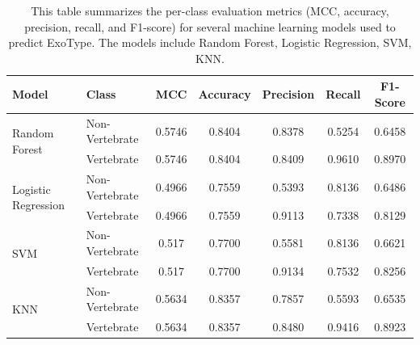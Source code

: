 \begin{table}[H]
	\centering
	\caption{This table summarizes the per-class evaluation metrics (MCC, accuracy, precision, recall, and F1-score) for several machine learning models used to predict ExoType. The models include Random Forest, Logistic Regression, SVM, KNN.}
	\begin{tabular}{llccccc}
		\toprule
		Model & Class & MCC & Accuracy & Precision & Recall & F1-Score \\
		\midrule
		\multirow{2}{*}{Random Forest} 
		& Non-Vertebrate & 0.5746 & 0.8404 & 0.8378 & 0.5254 & 0.6458 \\
		& Vertebrate & 0.5746 & 0.8404 & 0.8409 & 0.9610 & 0.8970 \\
		\midrule
		\multirow{2}{*}{Logistic Regression} 
		& Non-Vertebrate & 0.4966 & 0.7559 & 0.5393 & 0.8136 & 0.6486 \\
		& Vertebrate & 0.4966 & 0.7559 & 0.9113 & 0.7338 & 0.8129 \\
		\midrule
		\multirow{2}{*}{SVM} 
		& Non-Vertebrate & 0.517 & 0.7700 & 0.5581 & 0.8136 & 0.6621 \\
		& Vertebrate & 0.517 & 0.7700 & 0.9134 & 0.7532 & 0.8256 \\
		\midrule
		\multirow{2}{*}{KNN} 
		& Non-Vertebrate & 0.5634 & 0.8357 & 0.7857 & 0.5593 & 0.6535 \\
		& Vertebrate & 0.5634 & 0.8357 & 0.8480 & 0.9416 & 0.8923 \\
		\bottomrule
	\end{tabular}
	\label{tab:appendix_metrics_target}
\end{table}








































